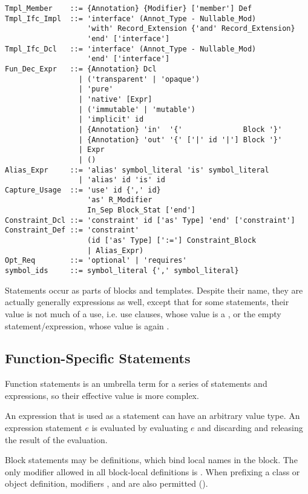 \begin{lstlisting}
Tmpl_Member    ::= {Annotation} {Modifier} ['member'] Def
Tmpl_Ifc_Impl  ::= 'interface' (Annot_Type - Nullable_Mod) 
                   'with' Record_Extension {'and' Record_Extension} 
                   'end' ['interface']
Tmpl_Ifc_Dcl   ::= 'interface' (Annot_Type - Nullable_Mod) 
                   'end' ['interface']
Fun_Dec_Expr   ::= {Annotation} Dcl
                 | ('transparent' | 'opaque')
                 | 'pure'
                 | 'native' [Expr]
                 | ('immutable' | 'mutable')
                 | 'implicit' id
                 | {Annotation} 'in'  '{'              Block '}'
                 | {Annotation} 'out' '{' ['|' id '|'] Block '}'
                 | Expr
                 | ()
Alias_Expr     ::= 'alias' symbol_literal 'is' symbol_literal
                 | 'alias' id 'is' id
Capture_Usage  ::= 'use' id {',' id} 
                   'as' R_Modifier
                   In_Sep Block_Stat ['end']
Constraint_Dcl ::= 'constraint' id ['as' Type] 'end' ['constraint']
Constraint_Def ::= 'constraint' 
                   (id ['as' Type] [':='] Constraint_Block 
                   | Alias_Expr)
Opt_Req        ::= 'optional' | 'requires'
symbol_ids     ::= symbol_literal {',' symbol_literal}
\end{lstlisting}

Statements occur as parts of blocks and templates. Despite their name, they are actually generally expressions as well, except that for some statements, their value is not much of a use, i.e. use clauses, whose value is a , or the empty statement/expression, whose value is again . 






\subsection{Function-Specific Statements}

Function statements is an umbrella term for a series of statements and expressions, so their effective value is more complex. 

An expression that is used as a statement can have an arbitrary value type. An expression statement $e$ is evaluated by evaluating $e$ and discarding and releasing the result of the evaluation. 

Block statements may be definitions, which bind local names in the block. The only modifier allowed in all block-local definitions is . When prefixing a class or object definition, modifiers ,  and  are also permitted ().

